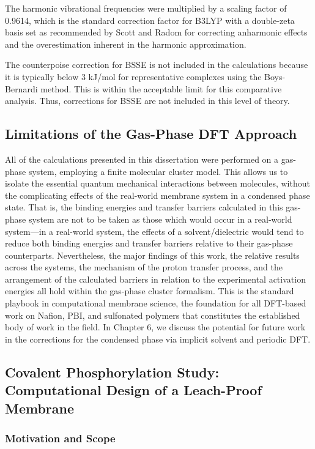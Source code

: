 \documentclass[12pt,a4paper]{report}
\begin{document}
The harmonic vibrational frequencies were multiplied by a scaling factor of 0.9614, which is the standard correction factor for B3LYP with a double-zeta basis set as recommended by Scott and Radom\cite{94} for correcting anharmonic effects and the overestimation inherent in the harmonic approximation.

The counterpoise correction for BSSE is not included in the calculations because it is typically below 3 kJ/mol for representative complexes using the Boys-Bernardi\cite{95} method. This is within the acceptable limit for this comparative analysis. Thus, corrections for BSSE are not included in this level of theory.\cite{18,19}

\subsection{Limitations of the Gas-Phase DFT Approach}
All of the calculations presented in this dissertation were performed on a gas-phase system, employing a finite molecular cluster model. This allows us to isolate the essential quantum mechanical interactions between molecules, without the complicating effects of the real-world membrane system in a condensed phase state. That is, the binding energies and transfer barriers calculated in this gas-phase system are not to be taken as those which would occur in a real-world system—in a real-world system, the effects of a solvent/dielectric would tend to reduce both binding energies and transfer barriers relative to their gas-phase counterparts. \cite{18,19}
Nevertheless, the major findings of this work, the relative results across the systems, the mechanism of the proton transfer process, and the arrangement of the calculated barriers in relation to the experimental activation energies all hold within the gas-phase cluster formalism. This is the standard playbook in computational membrane science, the foundation for all DFT-based work on Nafion, PBI, and sulfonated polymers that constitutes the established body of work in the field.\cite{18,19,20} In Chapter 6, we discuss the potential for future work in the corrections for the condensed phase via implicit solvent and periodic DFT.

\subsection{Covalent Phosphorylation Study: Computational 
Design of a Leach-Proof Membrane}

\subsubsection{Motivation and Scope}
\end{document}
